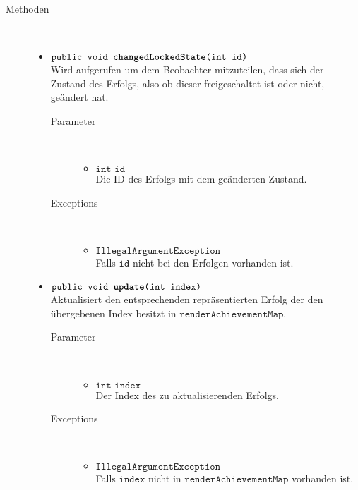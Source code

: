 \begin{description}
\item[Methoden] \hfill \\
	\vspace{-.8cm}
	\begin{itemize}
		\item $\texttt{public void \textbf{changedLockedState}(int id)}$ \\ Wird aufgerufen um dem Beobachter mitzuteilen, dass sich der Zustand des Erfolgs, also ob dieser freigeschaltet ist oder nicht, geändert hat.
			\begin{description}
				\item[Parameter] \hfill \\
				\vspace{-.8cm}
				\begin{itemize}
					\item $\texttt{int id}$ \\ Die ID des Erfolgs mit dem geänderten Zustand.
				\end{itemize}
				\item[Exceptions] \hfill \\
				\vspace{-.8cm}
				\begin{itemize}
					\item $\texttt{IllegalArgumentException}$ \\ Falls $\texttt{id}$ nicht bei den Erfolgen vorhanden ist.
				\end{itemize}
			\end{description}	
			
		\item $\texttt{public void \textbf{update}(int index)}$ \\ Aktualisiert den entsprechenden repräsentierten Erfolg der den übergebenen Index besitzt in $\texttt{renderAchievementMap}$.
			\begin{description}
				\item[Parameter] \hfill \\
				\vspace{-.8cm}
				\begin{itemize}
					\item $\texttt{int index}$ \\ Der Index des zu aktualisierenden Erfolgs.
				\end{itemize}
				\item[Exceptions] \hfill \\
				\vspace{-.8cm}
				\begin{itemize}
					\item $\texttt{IllegalArgumentException}$ \\ Falls $\texttt{index}$ nicht in $\texttt{renderAchievementMap}$ vorhanden ist.
				\end{itemize}
			\end{description}	
	

\end{itemize}
\end{description}
